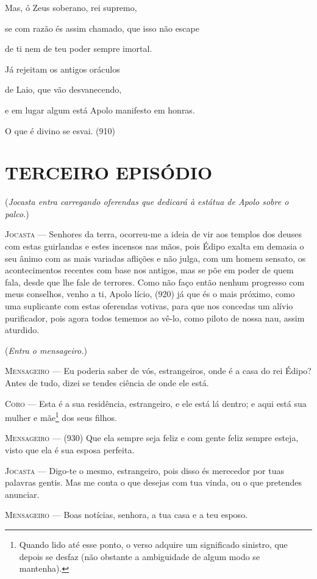 Mas, ó Zeus soberano, rei supremo,

se com razão és assim chamado, que isso não escape

de ti nem de teu poder sempre imortal.

Já rejeitam os antigos oráculos

de Laio, que vão desvanecendo,

e em lugar algum está Apolo manifesto em honras.

O que é divino se esvai. (910)

\section{TERCEIRO EPISÓDIO}

(\emph{Jocasta entra carregando oferendas que dedicará à estátua de
Apolo sobre o palco.})

\textsc{Jocasta} --- Senhores da terra, ocorreu-me a ideia de vir aos templos dos deuses com
estas guirlandas e estes incensos nas mãos, pois Édipo exalta em demasia
o seu ânimo com as mais variadas aflições e não julga, com um homem
sensato, os acontecimentos recentes com base nos antigos, mas se põe em
poder de quem fala, desde que lhe fale de terrores. Como não faço então
nenhum progresso com meus conselhos, venho a ti, Apolo lício, (920) já
que és o mais próximo, como uma suplicante com estas oferendas votivas,
para que nos concedas um alívio purificador, pois agora todos tememos ao
vê-lo, como piloto de nossa nau, assim aturdido.

(\emph{Entra o mensageiro.})

\textsc{Mensageiro} --- Eu poderia saber de vós, estrangeiros, onde é a casa do rei Édipo? Antes
de tudo, dizei se tendes ciência de onde ele está.

\textsc{Coro} --- Esta é a sua residência, estrangeiro, e ele está lá dentro; e aqui está
sua mulher e mãe\footnote{Quando lido até esse ponto, o verso adquire um
  significado sinistro, que depois se desfaz (não obstante a ambiguidade
  de algum modo se mantenha).} dos seus filhos.

\textsc{Mensageiro} --- (930) Que ela sempre seja feliz e com gente feliz sempre esteja, visto
que ela é sua esposa perfeita.

\textsc{Jocasta} --- Digo-te o mesmo, estrangeiro, pois disso és merecedor por tuas palavras
gentis. Mas me conta o que desejas com tua vinda, ou o que pretendes
anunciar.

\textsc{Mensageiro} --- Boas notícias, senhora, a tua casa e a teu esposo.

